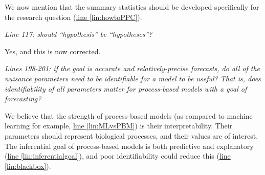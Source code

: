 \documentclass[11pt,letter]{article}
\begin{document}
We now mention that the summary statistics should be developed specifically for the research question (\href{file:forecastflows_r1\#lintarget:howtoPPC}{line \ref*{lin:howtoPPC}}). %

\begin{mybox}
\emph{Line 117: should “hypothesis” be “hypotheses”?}
\end{mybox}

Yes, and this is now corrected.

\begin{mybox}
\emph{Lines 198-201: if the goal is accurate and relatively-precise forecasts, do all of the nuisance parameters need to be identifiable for a model to be useful? That is, does identifiability of all parameters matter for process-based models with a goal of forecasting?}
\end{mybox}

We believe that the strength of process-based models (as compared to machine learning for example, \href{file:forecastflows_r1\#lintarget:MLvsPBM}{line \ref*{lin:MLvsPBM}}) is their interpretability. Their parameters should represent biological processes, and their values are of interest. The inferential goal of process-based models is both predictive and explanatory (\href{file:forecastflows_r1\#lintarget:inferentialgoal}{line \ref*{lin:inferentialgoal}}), and poor identifiability could reduce this (\href{file:forecastflows_r1\#lintarget:blackbox}{line \ref*{lin:blackbox}}).

%
\end{document}

